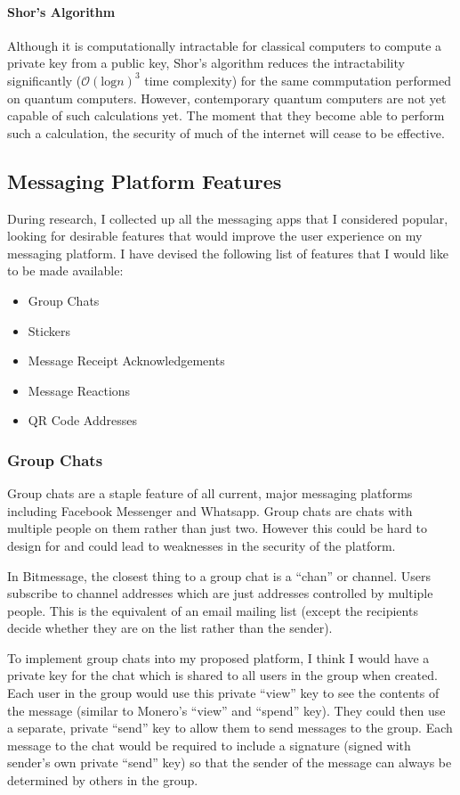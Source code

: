 \documentclass{article}
\begin{document}
\paragraph{Shor's Algorithm}
Although it is computationally intractable for classical computers to compute a private key from a public key, Shor's algorithm reduces the intractability significantly ($\mathcal O(\textrm{log} n)^3$ time complexity) for the same commputation performed on quantum computers. However, contemporary quantum computers are not yet capable of such calculations yet. The moment that they become able to perform such a calculation, the security of much of the internet will cease to be effective.

\newpage

\subsection{Messaging Platform Features}
During research, I collected up all the messaging apps that I considered popular, looking for desirable features that would improve the user experience on my messaging platform. I have devised the following list of features that I would like to be made available:
\begin{itemize}
    \item Group Chats
    \item Stickers
    \item Message Receipt Acknowledgements
    \item Message Reactions
    \item QR Code Addresses
\end{itemize}

\subsubsection{Group Chats}
Group chats are a staple feature of all current, major messaging platforms including Facebook Messenger and Whatsapp. Group chats are chats with multiple people on them rather than just two. However this could be hard to design for and could lead to weaknesses in the security of the platform.

In Bitmessage, the closest thing to a group chat is a ``chan'' or channel. Users subscribe to channel addresses which are just addresses controlled by multiple people. This is the equivalent of an email mailing list (except the recipients decide whether they are on the list rather than the sender).

To implement group chats into my proposed platform, I think I would have a private key for the chat which is shared to all users in the group when created. Each user in the group would use this private ``view'' key to see the contents of the message (similar to Monero's ``view'' and ``spend'' key). They could then use a separate, private ``send'' key to allow them to send messages to the group. Each message to the chat would be required to include a signature (signed with sender's own private ``send'' key) so that the sender of the message can always be determined by others in the group.
\end{document}
